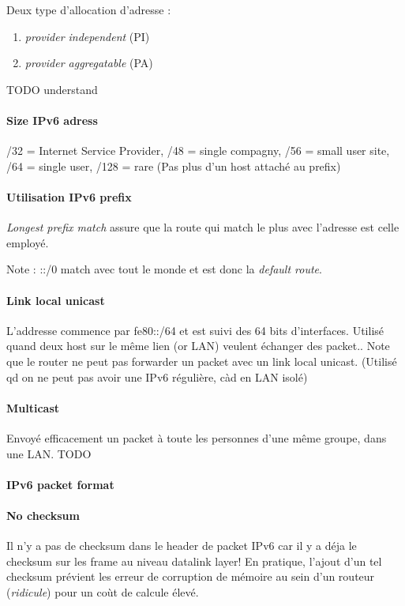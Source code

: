 Deux type d'allocation d'adresse :
\begin{enumerate}
    \item \textit{provider independent} (PI)
    \item \textit{provider aggregatable} (PA)
\end{enumerate}
TODO understand

\paragraph{Size IPv6 adress}
/32 = Internet Service Provider, /48 = single compagny, /56 = small user site,
/64 = single user, /128 = rare (Pas plus d'un host attaché au prefix)

\paragraph{Utilisation IPv6 prefix}
\textit{Longest prefix match} assure que la route qui match le plus avec
l'adresse est celle employé.

Note : ::/0 match avec tout le monde et est donc la \textit{default route}.

\paragraph{Link local unicast}
L'addresse commence par fe80::/64 et est suivi des 64 bits d'interfaces.
Utilisé quand deux host sur le même lien (or LAN) veulent échanger des
packet.. Note que le router ne peut pas forwarder un packet avec un
link local unicast.
(Utilisé qd on ne peut pas avoir une IPv6 régulière, càd en LAN isolé)


\paragraph{Multicast}
Envoyé efficacement un packet à toute les personnes d'une même groupe, dans une LAN.
TODO

\paragraph{IPv6 packet format}

\paragraph{No checksum}
Il n'y a pas de checksum dans le header de packet IPv6 car il y a déja le checksum
sur les frame au niveau datalink layer! En pratique, l'ajout d'un tel checksum prévient
les erreur de corruption de mémoire au sein d'un routeur (\textit{ridicule}) pour un coùt de
calcule élevé.

